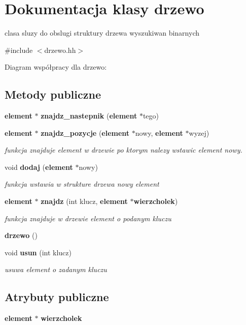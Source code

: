 \section{\-Dokumentacja klasy drzewo}
\label{classdrzewo}


clasa sluzy do obslugi struktury drzewa wyszukiwan binarnych  




{\ttfamily \#include $<$drzewo.\-hh$>$}



\-Diagram współpracy dla drzewo\-:
\subsection*{\-Metody publiczne}
\begin{DoxyCompactItemize}
\item 
{\bf element} $\ast$ {\bf znajdz\-\_\-nastepnik} ({\bf element} $\ast$tego)
\item 
{\bf element} $\ast$ {\bf znajdz\-\_\-pozycje} ({\bf element} $\ast$nowy, {\bf element} $\ast$wyzej)
\begin{DoxyCompactList}\small\item\em funkcja znajduje element w drzewie po ktorym nalezy wstawic element nowy. \end{DoxyCompactList}\item 
void {\bf dodaj} ({\bf element} $\ast$nowy)
\begin{DoxyCompactList}\small\item\em funkcja wstawia w strukture drzewa nowy element \end{DoxyCompactList}\item 
{\bf element} $\ast$ {\bf znajdz} (int klucz, {\bf element} $\ast${\bf wierzcholek})
\begin{DoxyCompactList}\small\item\em funkcja znajduje w drzewie element o podanym kluczu \end{DoxyCompactList}\item 
{\bf drzewo} ()
\item 
void {\bf usun} (int klucz)
\begin{DoxyCompactList}\small\item\em usuwa element o zadanym kluczu \end{DoxyCompactList}\end{DoxyCompactItemize}
\subsection*{\-Atrybuty publiczne}
\begin{DoxyCompactItemize}
\item 
{\bf element} $\ast$ {\bf wierzcholek}
\end{DoxyCompactItemize}



